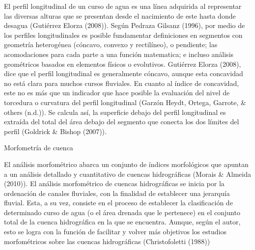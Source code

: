 \documentclass[11pt,]{article}
\begin{document}
El perfil longitudinal de un curso de agua es una línea adquirida al
representar las diversas alturas que se presentan desde el nacimiento de
este hasta donde desagua (Gutiérrez Elorza (2008)). Según Pedraza
Gilsanz (1996), por medio de los perfiles longitudinales es posible
fundamentar definiciones en segmentos con geometría heterogénea
(cóncavo, convexo y rectilíneo), o pendiente; las acomodaciones para
cada parte a una función matematica; e incluso análisis geométricos
basados en elementos físicos o evolutivos. Gutiérrez Elorza (2008), dice
que el perfil longitudinal es generalmente cóncavo, aunque esta
concavidad no está clara para muchos cursos fluviales. En cuanto al
índice de concavidad, este no es más que un indicador que hace posible
la evaluación del nivel de torcedura o curvatura del perfil longitudinal
(Garzón Heydt, Ortega, Garrote, \& others (n.d.)). Se calcula así, la
superficie debajo del perfil longitudinal es extraída del total del área
debajo del segmento que conecta los dos límites del perfil (Goldrick \&
Bishop (2007)).

Morfometría de cuenca

El análisis morfométrico abarca un conjunto de índices morfológicos que
apuntan a un análisis detallado y cuantitativo de cuencas hidrográficas
(Morais \& Almeida (2010)). El análisis morfométrico de cuencas
hidrográficas se inicia por la ordenación de canales fluviales, con la
finalidad de establecer una jerarquía fluvial. Esta, a su vez, consiste
en el proceso de establecer la clasificación de determinado curso de
agua (o el área drenada que le pertenece) en el conjunto total de la
cuenca hidrográfica en la que se encuentra. Aunque, según el autor, esto
se logra con la función de facilitar y volver más objetivos los estudios
morfométricos sobre las cuencas hidrográficas (Christofoletti (1988))
\end{document}
